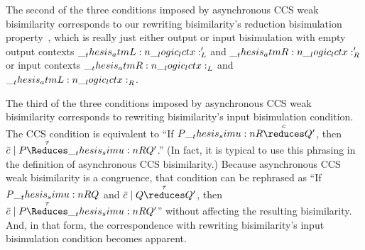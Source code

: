 The second of the three conditions imposed by asynchronous \ac{CCS} weak bisimilarity corresponds to our rewriting bisimilarity's reduction bisimulation property~, which is really just either output or input bisimulation with empty output contexts $\__thesis_atmL:n {\__logic_lctx:}'_L$ and $\__thesis_atmR:n {\__logic_lctx:}'_R$ or input contexts $\__thesis_atmR:n {\__logic_lctx:}_L$ and $\__thesis_atmL:n {\__logic_lctx:}_R$.

The third of the three conditions imposed by asynchronous \ac{CCS} weak bisimilarity corresponds to rewriting bisimilarity's input bisimulation condition.
The \ac{CCS} condition is equivalent to \enquote{If $P \simu{R}\overset{c}{\reduces} Q'$, then $\bar{c} \mid P \overset{\tau}{\Reduces}\simu{R} Q'$.}
(In fact, it is typical to use this phrasing in the definition of asynchronous \ac{CCS} bisimilarity.)
Because asynchronous \ac{CCS} weak bisimilarity is a congruence, that condition can be rephrased as \enquote{If $P \__thesis_simu:n {R} Q$ and $\bar{c} \mid Q \overset{\tau}{\reduces} Q'$, then $\bar{c} \mid P \overset{\tau}{\Reduces}\simu{R} Q'$} without affecting the resulting bisimilarity.
And, in that form, the correspondence with rewriting bisimilarity's input bisimulation condition becomes apparent.










